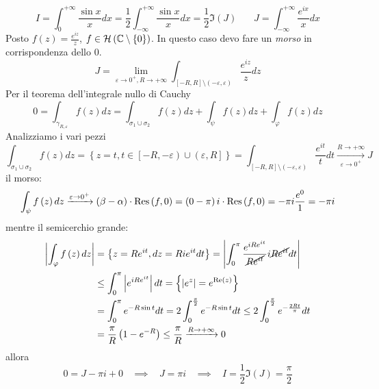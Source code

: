 \Soluzione
\begin{equation*}
I = \int ^{ + \infty }_{0}\frac{\sin x}{x} dx = \frac{1}{2}\int ^{ + \infty }_{ - \infty }\frac{\sin x}{x} dx = \frac{1}{2}\Im \left(J\right) \ \ \ \ \ \ \ \ J = \int ^{ + \infty }_{ - \infty }\frac{e^{ix}}{x} dx
\end{equation*}
Posto $f\left(z\right) = \frac{e^{iz}}{z}$, $f\in \Hc \left(\CC  \setminus \left\{0\right\}\right)$. In questo caso devo fare un \textit{morso} in corrispondenza dello $0$.
\begin{equation*}
J = \lim _{\varepsilon \rightarrow 0^{ + } ,R\rightarrow + \infty }\int _{\left[ - R,R\right] \setminus \left(- \varepsilon ,\varepsilon \right)}\frac{e^{iz}}{z} dz
\end{equation*}
Per il teorema dell'integrale nullo di Cauchy
\begin{equation*}
0 = \int _{\gamma _{R,\varepsilon }} f\left(z\right) dz = \int _{\sigma _{1} \cup \sigma _{2}} f\left(z\right) dz + \int _{\psi } f\left(z\right) dz + \int _{\varphi } f\left(z\right) dz
\end{equation*}
Analizziamo i vari pezzi
\begin{equation*}
\int _{\sigma _{1} \cup \sigma _{2}} f\left(z\right) dz = \left\{z = t,t\in \left[ - R, - \varepsilon \right) \cup \left(\varepsilon ,R\right]\right\} = \int _{\left[ - R,R\right] \setminus \left(- \varepsilon ,\varepsilon \right)}\frac{e^{it}}{t} dt\xrightarrow[\varepsilon \rightarrow 0^{ + }]{R\rightarrow + \infty } J
\end{equation*}
il morso:
\begin{equation*}
\int _{\psi } f\left(z\right) dz\xrightarrow{\varepsilon \rightarrow 0^{ + }}\left(\beta - \alpha \right) \cdot \Res \left(f,0\right) = \left(0 - \pi \right) i\cdot \Res \left(f,0\right) = - \pi i\frac{e^{0}}{1} = - \pi i
\end{equation*}
mentre il semicerchio grande:
\begin{align*}
\left| \int _{\varphi } f\left(z\right) dz\right|  & = \left\{z = Re^{it} ,dz = Rie^{it} dt\right\} = \left| \int ^{\pi }_{0}\frac{e^{iRe^{it}}}{\cancel{Re^{it}}} i\cancel{Re^{it}} dt\right| \\
 & \leq \int ^{\pi }_{0}\left| e^{iRe^{it}}\right| dt = \left\{\left| e^{z}\right| = e^{\Re \left(z\right)}\right\}\\
 & = \int ^{\pi }_{0} e^{ - R\sin t} dt = 2\int ^{\frac{\pi }{2}}_{0} e^{ - R\sin t} dt\leq 2\int ^{\frac{\pi }{2}}_{0} e^{ - \frac{2Rt}{\pi }} dt\\
 & = \frac{\pi }{R}\left(1 - e^{ - R}\right) \leq \frac{\pi }{R}\xrightarrow{R\rightarrow + \infty } 0
\end{align*}
allora
\begin{equation*}
0 = J - \pi i + 0\ \ \ \ \implies \ \ \ \ J = \pi i\ \ \ \ \implies \ \ \ \ I = \frac{1}{2}\Im \left(J\right) = \frac{\pi }{2}
\end{equation*}
\Soluzione

